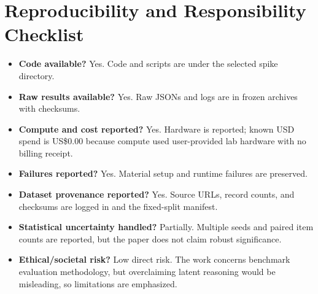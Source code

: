 \documentclass{article}
\begin{document}
\section{Reproducibility and Responsibility Checklist}
\label{checklist_reproducibility}

\begin{itemize}
  \item \textbf{Code available?} Yes. Code and scripts are under the selected spike directory.
  \item \textbf{Raw results available?} Yes. Raw JSONs and logs are in frozen archives with checksums.
  \item \textbf{Compute and cost reported?} Yes. Hardware is reported; known USD spend is US\$0.00 because compute used user-provided lab hardware with no billing receipt.
  \item \textbf{Failures reported?} Yes. Material setup and runtime failures are preserved.
  \item \textbf{Dataset provenance reported?} Yes. Source URLs, record counts, and checksums are logged in  and the fixed-split manifest.
  \item \textbf{Statistical uncertainty handled?} Partially. Multiple seeds and paired item counts are reported, but the paper does not claim robust significance.
  \item \textbf{Ethical/societal risk?} Low direct risk. The work concerns benchmark evaluation methodology, but overclaiming latent reasoning would be misleading, so limitations are emphasized.
\end{itemize}
\end{document}
